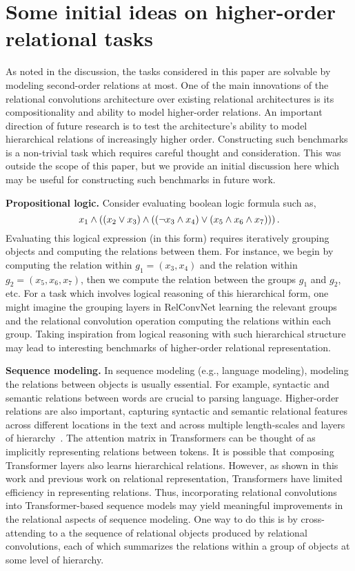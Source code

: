 \section{Some initial ideas on higher-order relational tasks}

As noted in the discussion, the tasks considered in this paper are solvable by modeling second-order relations at most. One of the main innovations of the relational convolutions architecture over existing relational architectures is its compositionality and ability to model higher-order relations. An important direction of future research is to test the architecture's ability to model hierarchical relations of increasingly higher order. Constructing such benchmarks is a non-trivial task which requires careful thought and consideration. This was outside the scope of this paper, but we provide an initial discussion here which may be useful for constructing such benchmarks in future work.

\textbf{Propositional logic.} Consider evaluating boolean logic formula such as, 
\begin{equation*}
    x_1 \land \left((x_2 \lor x_3) \land \left((\lnot x_3 \land x_4) \lor (x_5 \land x_6 \land x_7)\right)\right).
\end{equation*}
Evaluating this logical expression (in this form) requires iteratively grouping objects and computing the relations between them. For instance, we begin by computing the relation within $g_1 = (x_3, x_4)$ and the relation within $g_2 = (x_5, x_6, x_7)$, then we compute the relation between the groups $g_1$ and $g_2$, etc. For a task which involves logical reasoning of this hierarchical form, one might imagine the grouping layers in RelConvNet learning the relevant groups and the relational convolution operation computing the relations within each group. Taking inspiration from logical reasoning with such hierarchical structure may lead to interesting benchmarks of higher-order relational representation.

\textbf{Sequence modeling.} In sequence modeling (e.g., language modeling), modeling the relations between objects is usually essential. For example, syntactic and semantic relations between words are crucial to parsing language. Higher-order relations are also important, capturing syntactic and semantic relational features across different locations in the text and across multiple length-scales and layers of hierarchy~\citep[see for example some relevant work in linguistics][]{frank2012hierarchical,rosario2002descent}. The attention matrix in Transformers can be thought of as implicitly representing relations between tokens. It is possible that composing Transformer layers also learns hierarchical relations. However, as shown in this work and previous work on relational representation, Transformers have limited efficiency in representing relations. Thus, incorporating relational convolutions into Transformer-based sequence models may yield meaningful improvements in the relational aspects of sequence modeling. One way to do this is by cross-attending to a the sequence of relational objects produced by relational convolutions, each of which summarizes the relations within a group of objects at some level of hierarchy.

